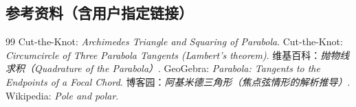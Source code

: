 \documentclass{ctexart}
\begin{document}
	\subsection*{参考资料（含用户指定链接）}
	\begin{thebibliography}{99}
		 Cut-the-Knot: \textit{Archimedes Triangle and Squaring of Parabola}.
		 Cut-the-Knot: \textit{Circumcircle of Three Parabola Tangents (Lambert's theorem)}.
		 维基百科：\textit{抛物线求积（Quadrature of the Parabola）}.
		 GeoGebra: \textit{Parabola: Tangents to the Endpoints of a Focal Chord}.
		 博客园：\textit{阿基米德三角形（焦点弦情形的解析推导）}.
		 Wikipedia: \textit{Pole and polar}.
	\end{thebibliography}
\end{document}
